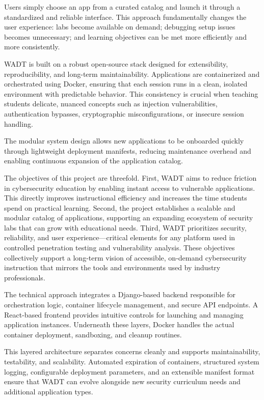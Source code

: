 \documentclass[12pt,titlepage]{article}
\begin{document}
Users simply choose an app from a curated catalog and launch it through a standardized and reliable interface. This approach fundamentally changes the user experience: labs become available on demand; debugging setup issues becomes unnecessary; and learning objectives can be met more efficiently and more consistently.

WADT is built on a robust open-source stack designed for extensibility, reproducibility, and long-term maintainability. Applications are containerized and orchestrated using Docker, ensuring that each session runs in a clean, isolated environment with predictable behavior. This consistency is crucial when teaching students delicate, nuanced concepts such as injection vulnerabilities, authentication bypasses, cryptographic misconfigurations, or insecure session handling.

The modular system design allows new applications to be onboarded quickly through lightweight deployment manifests, reducing maintenance overhead and enabling continuous expansion of the application catalog.

The objectives of this project are threefold. First, WADT aims to reduce friction in cybersecurity education by enabling instant access to vulnerable applications. This directly improves instructional efficiency and increases the time students spend on practical learning. Second, the project establishes a scalable and modular catalog of applications, supporting an expanding ecosystem of security labs that can grow with educational needs. Third, WADT prioritizes security, reliability, and user experience—critical elements for any platform used in controlled penetration testing and vulnerability analysis. These objectives collectively support a long-term vision of accessible, on-demand cybersecurity instruction that mirrors the tools and environments used by industry professionals.

The technical approach integrates a Django-based backend responsible for orchestration logic, container lifecycle management, and secure API endpoints. A React-based frontend provides intuitive controls for launching and managing application instances. Underneath these layers, Docker handles the actual container deployment, sandboxing, and cleanup routines.

This layered architecture separates concerns cleanly and supports maintainability, testability, and scalability. Automated expiration of containers, structured system logging, configurable deployment parameters, and an extensible manifest format ensure that WADT can evolve alongside new security curriculum needs and additional application types.
\end{document}
